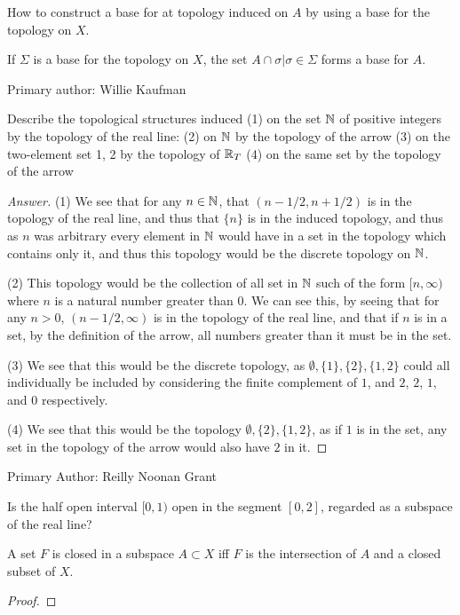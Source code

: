 \begin{minorEx}[Riddle]%
How to construct a base for at topology induced on $A$ by using a base for the topology on $X$.
\end{minorEx}
If $\Sigma$ is a base for the topology on $X$, the set ${A \cap \sigma | \sigma \in \Sigma}$ forms a base for $A$. 

Primary author: Willie Kaufman

\begin{minorEx}%
Describe the topological structures induced
(1) on the set $\mathbb{N}$ of positive integers by the topology of the real line:
(2) on $\mathbb{N}$ by the topology of the arrow
(3) on the two-element set {1, 2} by the topology of $\mathbb{R}_T$
(4) on the same set by the topology of the arrow
\end{minorEx}

\begin{proof}[Answer]
  (1) We see that for any $n\in \mathbb{N}$, that $(n-1/2, n+1/2)$ is in the
  topology of the real line, and thus that $\{n\}$ is in the induced
  topology, and thus as $n$ was arbitrary every element in $\mathbb{N}$ would
  have in a set in the topology which contains only it, and thus this
  topology would be the discrete topology on $\mathbb{N}$.

  (2) This topology would be the collection of all set in $\mathbb{N}$ such
  of the form $[n, \infty)$ where $n$ is a natural number greater than
  $0$. We can see this, by seeing that for any $n>0$, $(n-1/2,\infty)$
  is in the topology of the real line, and that if $n$ is in a set, by
  the definition of the arrow, all numbers greater than it must be in
  the set.
  
  (3) We see that this would be the discrete topology, as
  $\emptyset,\{1\},\{2\}, \{1,2\}$ could all individually be included
    by considering the finite complement of $1$, and $2$, $2$, $1$,
    and $0$ respectively.

  (4) We see that this would be the topology $\emptyset,\{2\},
  \{1,2\}$, as if $1$ is in the set, any set in the topology of the
  arrow would also have $2$ in it.
\end{proof}
Primary Author: Reilly Noonan Grant

\begin{minorEx}%
Is the half open interval $[0, 1)$ open in the segment $[0, 2]$, regarded as a subspace of the real line?
\end{minorEx}

\begin{majorEx}%
A set $F$ is closed in a subspace $A \subset X$ iff $F$ is the intersection of $A$ and a closed subset of $X$.
\end{majorEx}
\begin{proof}
\end{proof}

